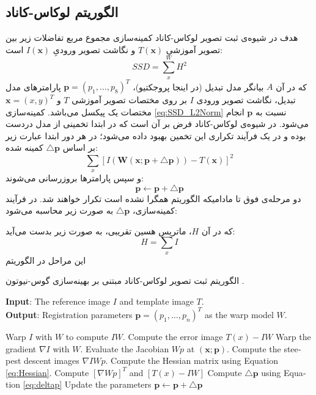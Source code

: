 \documentclass[11pt,a4paper,twocolumn]{article}
\makeatletter
\numberwithin{table}{section}
\let\orig@lr\lr
\renewcommand*{\lr}[1]{\texorpdfstring{\orig@lr{#1}}{#1}}
\makeatother
\begin{document}
\subsection{الگوریتم لوکاس-کاناد}
هدف در شیوه‌ی ثبت تصویر لوکاس-کاناد\cite{Lucas81iterative} کمینه‌سازی مجموع مربع تفاضلات زیر بین تصویر آموزشیِ $T(\mathbf{x})$ و نگاشت تصویر ورودیِ $I(\mathbf{x})$ است:
 \begin{equation}\label{eq:SSD_L2Norm}
    SSD=\sum _x ^{W} H^{2} 
\end{equation}
که در آن $A$ بیانگر مدل تبدیل‌ (در اینجا پروجکتیو)، $\mathbf{p}=(p_1,\dots,p_8)^T$ پارامترهای مدل تبدیل،  نگاشت تصویر ورودی $I$ بر روی مختصات تصویر آموزشی $T$ و $\mathbf{x} =(x,y)^T$ مختصات یک پیکسل می‌باشد.
 کمینه‌سازی \eqref{eq:SSD_L2Norm} نسبت به $\mathbf{p}$ انجام می‌شود. 
در شیوه‌ی لوکاس-کاناد فرض بر آن است که در ابتدا تخمینی از مدل دردست بوده و در یک فرآیند تکراری این تخمین بهبود داده می‌شود؛
در هر دور ابتدا عبارت زیر بر اساس $\triangle\mathbf{p}$ کمینه شده:
\begin{equation}\label{eq:SSD_L2Norm_deltap}
\sum_x[I(\mathbf{W}(\mathbf{x;\mathbf{p+\triangle p}}))-T(\mathbf{x})]^2
\end{equation}
و سپس پارامترها بروزرسانی می‌شوند:
\begin{equation}
\mathbf{p}\leftarrow\mathbf{p+\triangle p}
\end{equation}
دو مرحله‌ی فوق تا مادامیکه الگوریتم همگرا نشده است تکرار خواهند شد. در فرآیند کمینه‌سازی، $\mathbf{\triangle p}$ به صورت زیر محاسبه می‌شود:

که در آن $H$، ماتریس هسین تقریبی، به صورت زیر بدست می‌آید:
\begin{equation}\label{eq:Hessian}
    H = \sum _x I
\end{equation}
این مراحل در الگوریتم 
\begin{algorithm}
\caption{الگوریتم ثبت تصویر لوکاس-کاناد مبتنی بر بهینه‌سازی گوس-نیوتون .}
\label{alg1}
\begin{latin}
\textbf{Input}:
The reference image $I$ and template image $T$.\\
\textbf{Output}: Registration parameters
$\mathbf{p}=(p_1,\dots,p_n)^T$ as the warp model $W$.
\begin{algorithmic}[1]
\REPEAT
  \STATE Warp $I$ with $W$ to compute $IW$. 
  \STATE Compute the error image $T(x)-IW$ 
  \STATE Warp the gradient $\nabla I$ with $W$. \STATE Evaluate the Jacobian
    ${W}{p}$ at $(\mathbf{x;p})$. 
  \STATE Compute the steepest descent images $\nabla I{W}{p}$. 
  \STATE \label{line:Hessian} Compute the Hessian matrix using Equation 
    \eqref{eq:Hessian}. 
  \STATE Compute $[\nabla {W}{p}]^T$ and $[T(x)-IW]$ 
  \STATE \label{alg1:deltap} Compute $\triangle\mathbf{p}$ using Equation \eqref{eq:deltap} 
  \STATE Update the parameters $\mathbf{p}\leftarrow\mathbf{p}+\triangle\mathbf{p}$ 
\end{algorithmic}
\end{latin}
\end{algorithm}
\end{document}
